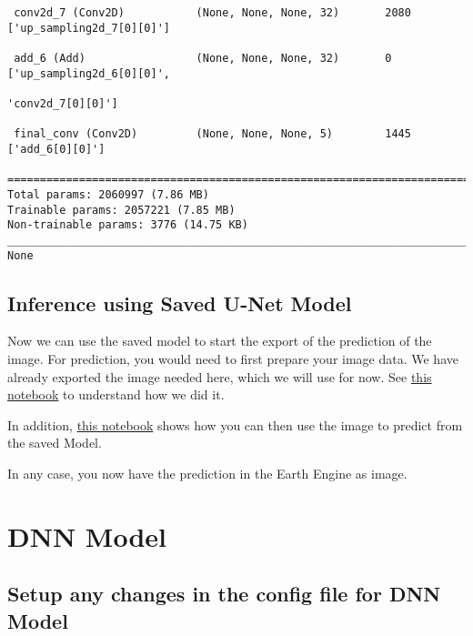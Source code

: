 \documentclass[
  letterpaper,
  DIV=11,
  numbers=noendperiod]{scrreprt}
\begin{document}
\begin{verbatim}
 conv2d_7 (Conv2D)           (None, None, None, 32)       2080      ['up_sampling2d_7[0][0]']     
                                                                                                  
 add_6 (Add)                 (None, None, None, 32)       0         ['up_sampling2d_6[0][0]',     
                                                                     'conv2d_7[0][0]']            
                                                                                                  
 final_conv (Conv2D)         (None, None, None, 5)        1445      ['add_6[0][0]']               
                                                                                                  
==================================================================================================
Total params: 2060997 (7.86 MB)
Trainable params: 2057221 (7.85 MB)
Non-trainable params: 3776 (14.75 KB)
__________________________________________________________________________________________________
None
\end{verbatim}

\subsection{Inference using Saved U-Net
Model}\label{inference-using-saved-u-net-model}

Now we can use the saved model to start the export of the prediction of
the image. For prediction, you would need to first prepare your image
data. We have already exported the image needed here, which we will use
for now. See
\href{https://colab.research.google.com/drive/1MZexam3GZKsQySQO9Jk_RPNyyMLmciEq?usp=sharing}{this
notebook} to understand how we did it.

In addition,
\href{https://colab.research.google.com/drive/19AZ-I7YrGNSsWkqbzjNLw3MXVeV4N2uX?usp=sharing}{this
notebook} shows how you can then use the image to predict from the saved
Model.

In any case, you now have the prediction in the Earth Engine as image.

\section{DNN Model}\label{dnn-model}

\subsection{Setup any changes in the config file for DNN
Model}\label{setup-any-changes-in-the-config-file-for-dnn-model}
\end{document}
